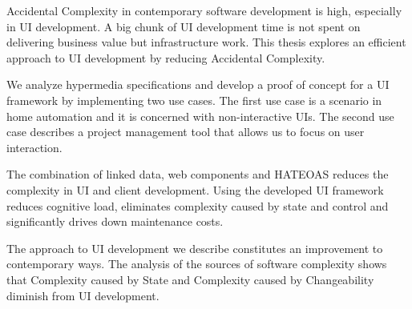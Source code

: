 Accidental Complexity in contemporary software development is high, especially in UI development. A big chunk of UI development time is not spent on delivering business value but infrastructure work. This thesis explores an efficient approach to UI development by reducing Accidental Complexity.

We analyze \gls{hypermedia} specifications and develop a proof of concept for a UI framework by implementing two use cases. The first use case is a scenario in home automation and it is concerned with non-interactive UIs. The second use case describes a project management tool that allows us to focus on user interaction.

The combination of linked data, web components and HATEOAS reduces the complexity in UI and client development. Using the developed UI framework reduces cognitive load, eliminates complexity caused by state and control and significantly drives down maintenance costs.

The approach to UI development we describe constitutes an improvement to contemporary ways. The analysis of the sources of software complexity shows that Complexity caused by State and Complexity caused by Changeability diminish from UI development.
